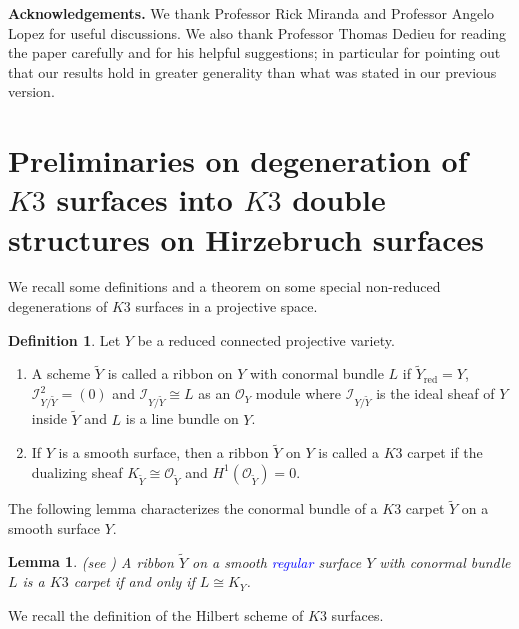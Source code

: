 \documentclass[11pt,twoside]{amsart}
\theoremstyle{plain}
\numberwithin{equation}{section}
\newtheorem{lemma}[theorem]{Lemma}
\theoremstyle{definition}
\newtheorem{definition}[theorem]{Definition}
\begin{document}
\vspace{0.2cm}

\noindent\textbf{Acknowledgements.} We thank Professor Rick Miranda and Professor Angelo Lopez for useful discussions. We also thank Professor Thomas Dedieu for reading the paper carefully and for his helpful suggestions; in particular for pointing out that our results hold in greater generality than what was stated in our previous version. 

\section{Preliminaries on degeneration of $K3$ surfaces into $K3$ double structures on Hirzebruch surfaces}

We recall some definitions and a theorem on some special non-reduced degenerations of $K3$ surfaces in a projective space.

\begin{definition}\label{ribbon}
Let $Y$ be a reduced connected projective variety.
 \begin{enumerate}
     \item A scheme $\widetilde{Y}$ is called a ribbon on $Y$ with conormal bundle $L$ if $\widetilde{Y}_{\operatorname{red}} = Y$, $\mathcal{I}_{Y/\widetilde{Y}}^2 = (0)$ and $\mathcal{I}_{Y/\widetilde{Y}} \cong L$ as an $\mathcal{O}_Y$ module where $\mathcal{I}_{Y/\widetilde{Y}}$ is the ideal sheaf of $Y$ inside $\widetilde{Y}$ and $L$ is a line bundle on $Y$. 

     \item If $Y$ is a smooth surface, then a ribbon $\widetilde{Y}$ on $Y$ is called a $K3$ carpet if the dualizing sheaf $K_{\widetilde{Y}} \cong \mathcal{O}_{\widetilde{Y}}$ and $H^1(\mathcal{O}_{\widetilde{Y}})= 0$.

\end{enumerate}
\end{definition}  

The following lemma characterizes the conormal bundle of a $K3$ carpet $\widetilde{Y}$ on a smooth surface $Y$.

\begin{lemma}(see \cite[\sout{Proposition $2.1$} \textcolor{blue}{Proposition $1.5$}]{GGP08})
    A ribbon $\widetilde{Y}$ on a smooth \textcolor{blue}{regular} surface $Y$ with conormal bundle $L$ is a $K3$ carpet if and only if $L \cong K_Y$.
\end{lemma}

\color{black}
We recall the definition of the Hilbert scheme of $K3$ surfaces.
\end{document}
